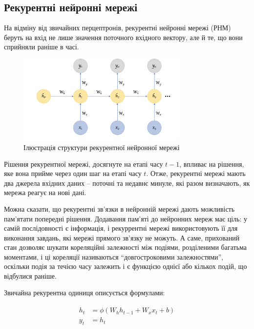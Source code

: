 \documentclass[a4paper,14pt]{extreport}
\begin{document}

\subsection{Рекурентні нейронні мережі}

На відміну від звичайних перцептронів, рекурентні нейронні
мережі (РНМ)
беруть на вхід не лише значення поточного вхідного вектору,
але й те, що вони сприйняли раніше в часі.

\begin{figure}[H]
    \centering
    \includegraphics[width=0.75\textwidth]{recurrent-nn.png}
    \caption{Ілюстрація структури рекурентної нейронної мережі}
    \label{fig:rnn}
\end{figure}

Рішення рекурентної мережі, досягнуте на етапі часу $t-1$, впливає
на рішення, яке вона прийме через один шаг на етапі часу $t$.
Отже, рекурентні мережі мають два джерела вхідних даних -- поточні
та недавнє минуле, які разом визначають, як мережа
реагує на нові дані.

Можна сказати, що рекурентні зв'язки в нейронній мережі
дають можливість пам'ятати попередні рішення.
Додавання пам’яті до нейронних мереж має ціль: у самій послідовності
є інформація, і рекуррентні мережі використовують її для виконання
завдань, які мережі прямого зв'язку не можуть.
А саме, прихований стан дозволяє шукати
кореляційні залежності між подіями, розділеними багатьма моментами,
і ці кореляції називаються ``довгостроковими залежностями'',
оскільки подія за течією часу залежить і є функцією однієї
або кількох подій, що відбулися раніше.

Звичайна рекурентна одиниця описується формулами:

\begin{gather}
\begin{aligned}
    h_t &= \phi(W_h h_{t-1}+W_x x_t+b)\\
    y_t &= h_t
\end{aligned}
\end{gather}
\end{document}

